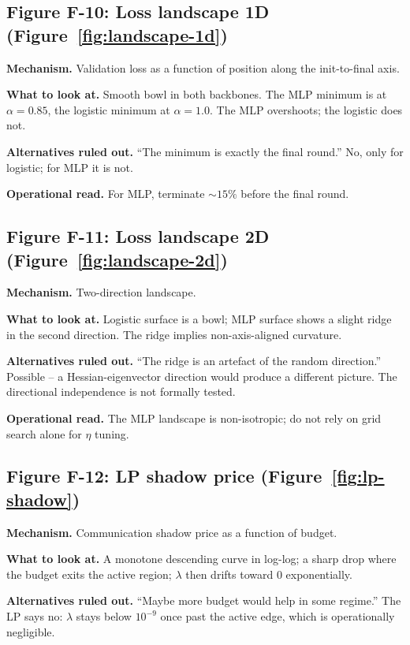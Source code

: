 \subsection{Figure F-10: Loss landscape 1D
(Figure~\ref{fig:landscape-1d})}
\textbf{Mechanism.} Validation loss as a function of position
along the init-to-final axis.

\textbf{What to look at.} Smooth bowl in both backbones. The MLP
minimum is at $\alpha\!=\!0.85$, the logistic minimum at
$\alpha\!=\!1.0$. The MLP overshoots; the logistic does not.

\textbf{Alternatives ruled out.} ``The minimum is exactly the
final round.'' No, only for logistic; for MLP it is not.

\textbf{Operational read.} For MLP, terminate $\sim$$15\%$ before
the final round.

\subsection{Figure F-11: Loss landscape 2D
(Figure~\ref{fig:landscape-2d})}
\textbf{Mechanism.} Two-direction landscape.

\textbf{What to look at.} Logistic surface is a bowl; MLP surface
shows a slight ridge in the second direction. The ridge implies
non-axis-aligned curvature.

\textbf{Alternatives ruled out.} ``The ridge is an artefact of
the random direction.'' Possible -- a Hessian-eigenvector direction
would produce a different picture. The directional independence is
not formally tested.

\textbf{Operational read.} The MLP landscape is non-isotropic; do
not rely on grid search alone for $\eta$ tuning.

\subsection{Figure F-12: LP shadow price
(Figure~\ref{fig:lp-shadow})}
\textbf{Mechanism.} Communication shadow price as a function of
budget.

\textbf{What to look at.} A monotone descending curve in
log-log; a sharp drop where the budget exits the active region;
$\lambda$ then drifts toward $0$ exponentially.

\textbf{Alternatives ruled out.} ``Maybe more budget would help in
some regime.'' The LP says no: $\lambda$ stays below $10^{-9}$ once
past the active edge, which is operationally negligible.

